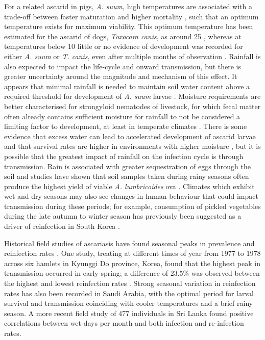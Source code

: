 For a related ascarid in pigs, \textit{A. suum}, high temperatures are associated with a trade-off between faster maturation and higher mortality \cite{Arene}, such that an optimum temperature exists for maximum viability. This optimum temperature has been estimated for the ascarid of dogs, \textit{Toxocara canis}, as around 25 \cite{Azam}, whereas at temperatures below 10 little or no evidence of development was recorded for either \textit{A. suum} or \textit{T. canis}, even after multiple months of observation \cite{Kim,Azam}. Rainfall is also expected to impact the life-cycle and onward transmission, but there is greater uncertainty around the magnitude and mechanism of this effect. It appears that minimal rainfall is needed to maintain soil water content above a required threshold for development of \textit{A. suum} larvae \cite{Nilson}. Moisture requirements are better characterised for strongyloid nematodes of livestock, for which fecal matter often already contains sufficient moisture for rainfall to not be considered a limiting factor to development, at least in temperate climates \cite{OConnor2007,OConnor2008}. There is some evidence that excess water can lead to accelerated development of ascarid larvae \cite{Nilson} and that survival rates are higher in environments with higher moisture \cite{Roepstorff}, but it is possible that the greatest impact of rainfall on the infection cycle is through transmission. Rain is associated with greater sequestration of eggs through the soil and studies have shown that soil samples taken during rainy seasons often produce the highest yield of viable \textit{A. lumbricoides} ova \cite{Gelpi}. Climates which exhibit wet and dry seasons may also see changes in human behaviour that could impact transmission during these periods; for example, consumption of pickled vegetables during the late autumn to winter season has previously been suggested as a driver of reinfection in South Korea \cite{Seo}.

Historical field studies of ascariasis have found seasonal peaks in prevalence \cite{Pan, Gungoren} and reinfection rates \cite{Seo}. One study, treating at different times of year from 1977 to 1978 across six hamlets in Kyunggi Do province, Korea, found that the highest peak in transmission occurred in early spring; a difference of 23.5\% was observed between the highest and lowest reinfection rates \cite{Seo}. Strong seasonal variation in reinfection rates has also been recorded in Saudi Arabia\cite{Gelpi}, with the optimal period for larval survival and transmission coinciding with cooler temperatures and a brief rainy season. A more recent field study of 477 individuals in Sri Lanka \cite{Gunawardena} found positive correlations between wet-days per month and both infection and re-infection rates.

